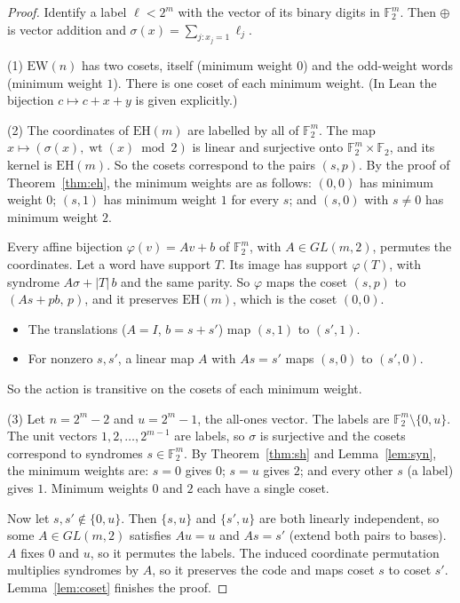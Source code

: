 \documentclass[11pt]{article}
\theoremstyle{definition}
\theoremstyle{remark}
\newcommand{\F}{\mathbb{F}_2}
\newcommand{\wt}{\operatorname{wt}}
\begin{document}
\begin{proof}
Identify a label $\ell<2^m$ with the vector of its binary digits in $\F^m$.
Then $\oplus$ is vector addition and $\sigma(x)=\sum_{j:x_j=1}\ell_j$.

(1) $\mathrm{EW}(n)$ has two cosets, itself (minimum weight $0$) and the
odd-weight words (minimum weight $1$). There is one coset of each minimum
weight. (In Lean the bijection $c\mapsto c+x+y$ is given explicitly.)

(2) The coordinates of $\mathrm{EH}(m)$ are labelled by all of $\F^m$. The map
$x\mapsto(\sigma(x),\wt(x)\bmod 2)$ is linear and surjective onto
$\F^m\times\F$, and its kernel is $\mathrm{EH}(m)$. So the cosets correspond to
the pairs $(s,p)$. By the proof of Theorem~\ref{thm:eh}, the minimum weights
are as follows: $(0,0)$ has minimum weight $0$; $(s,1)$ has minimum weight $1$
for every $s$; and $(s,0)$ with $s\neq 0$ has minimum weight $2$.

Every affine bijection $\varphi(v)=Av+b$ of $\F^m$, with $A\in GL(m,2)$,
permutes the coordinates. Let a word have support $T$. Its image has support
$\varphi(T)$, with syndrome $A\sigma+|T|\,b$ and the same parity. So $\varphi$
maps the coset $(s,p)$ to $(As+pb,\,p)$, and it preserves $\mathrm{EH}(m)$,
which is the coset $(0,0)$.
\begin{itemize}
\item The translations ($A=I$, $b=s+s'$) map $(s,1)$ to $(s',1)$.
\item For nonzero $s,s'$, a linear map $A$ with $As=s'$ maps $(s,0)$ to
$(s',0)$.
\end{itemize}
So the action is transitive on the cosets of each minimum weight.

(3) Let $n=2^m-2$ and $u=2^m-1$, the all-ones vector. The labels are
$\F^m\setminus\{0,u\}$. The unit vectors $1,2,\dots,2^{m-1}$ are labels, so
$\sigma$ is surjective and the cosets correspond to syndromes $s\in\F^m$. By
Theorem~\ref{thm:sh} and Lemma~\ref{lem:syn}, the minimum weights are: $s=0$
gives $0$; $s=u$ gives $2$; and every other $s$ (a label) gives $1$. Minimum
weights $0$ and $2$ each have a single coset.

Now let $s,s'\notin\{0,u\}$. Then $\{s,u\}$ and $\{s',u\}$ are both linearly
independent, so some $A\in GL(m,2)$ satisfies $Au=u$ and $As=s'$ (extend both
pairs to bases). $A$ fixes $0$ and $u$, so it permutes the labels. The induced
coordinate permutation multiplies syndromes by $A$, so it preserves the code
and maps coset $s$ to coset $s'$. Lemma~\ref{lem:coset} finishes the proof.
\end{proof}
\end{document}
